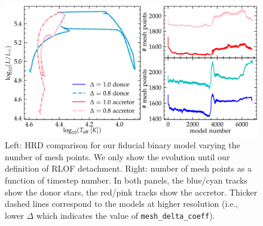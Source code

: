 \documentclass[twocolumn,twocolappendix,trackchanges]{aastex63}
\begin{document}
\begin{figure}[htbp]
  \centering
  \includegraphics[width=\textwidth]{spatial_res_plot}
  \caption{Left: HRD comparison for our fiducial binary model varying
  the number of mesh points. We only show the evolution until our definition
  of RLOF detachment. Right: number of mesh points as a
  function of timestep number. In both panels, the blue/cyan tracks show the donor stars, the
red/pink tracks show the accretor. Thicker dashed lines correspond to
the models at higher resolution (i.e., lower $\Delta$ which indicates
the value of \texttt{mesh\_delta\_coeff}).}
\end{figure}




\end{document}
